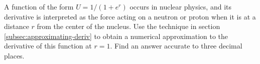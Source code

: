 A function of the form $U=1/(1+e^r)$ occurs in nuclear physics,
and its derivative is interpreted as the force acting on a neutron
or proton when it is at a distance $r$ from the center of the nucleus.
Use the technique in section \ref{subsec:approximating-deriv} to
obtain a numerical approximation to the derivative of this
function at $r=1$. Find an answer accurate to
three decimal places.\answercheck
